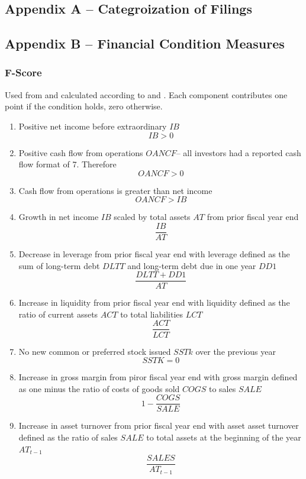 \documentclass[12pt]{article}
\begin{document}
\subsection{Appendix A -- Categroization of Filings}

\subsection{Appendix B -- Financial Condition Measures}

\subsubsection{F-Score}
Used from \citet{Piotroski2000} and calculated according to \citet{Fama2006} and \citet{Choi2012}. Each component contributes one point if the condition holds, zero otherwise. 

	\begin{enumerate}
		\item Positive net income before extraordinary $IB$ $$IB>0$$
		\item Positive cash flow from operations  $OANCF$-- all investors had a reported cash flow format of 7. Therefore $$OANCF>0$$
		\item Cash flow from operations is greater than net income $$OANCF>IB$$
		\item Growth in net income $IB$ scaled by total assets $AT$ from prior fiscal year end $$\frac{IB}{AT}$$
		\item Decrease in leverage from prior fiscal year end with leverage defined as the sum of long-term debt $DLTT$ and long-term debt due in one year $DD1$ $$\frac{DLTT+DD1}{AT}$$
		\item Increase in liquidity from prior fiscal year end with liquidity defined as the ratio of current assets $ACT$ to total liabilities $LCT$ $$\frac{ACT}{LCT}$$
		\item No new common or preferred stock issued $SSTk$ over the previous year $$SSTK=0$$
		\item Increase in gross margin from piror fiscal year end with gross margin defined as one minus the ratio of costs of goods sold $COGS$ to sales $SALE$ $$1-\frac{COGS}{SALE}$$
		\item Increase in asset turnover from prior fiscal year end with asset asset turnover defined as the ratio of sales $SALE$ to total assets at the beginning of the year $AT_{t-1}$ $$\frac{SALES}{AT_{t-1}}$$
	\end{enumerate}
\end{document}
